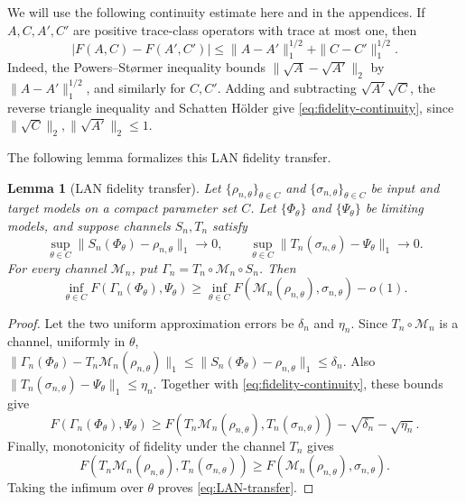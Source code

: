 \documentclass[11pt]{article}
\newtheorem{lemma}[lemma]{Lemma}
\theoremstyle{remark}
\theoremstyle{plain}
\newcommand{\cM}{\mathcal M}
\begin{document}
We will use the following continuity estimate here and in the appendices.  If
\(A,C,A',C'\) are positive trace-class operators with trace at most one, then
\begin{equation}\label{eq:fidelity-continuity}
  |F(A,C)-F(A',C')|
  \le \|A-A'\|_1^{1/2}+\|C-C'\|_1^{1/2}.
\end{equation}
Indeed, the Powers--St\o rmer inequality bounds
\(\|\sqrt A-\sqrt{A'}\|_2\) by \(\|A-A'\|_1^{1/2}\), and similarly for
\(C,C'\).  Adding and subtracting \(\sqrt{A'}\sqrt C\), the reverse triangle
inequality and Schatten H\"older give \eqref{eq:fidelity-continuity}, since
\(\|\sqrt C\|_2,\|\sqrt{A'}\|_2\le1\).

The following lemma formalizes this LAN fidelity transfer.

\begin{lemma}[LAN fidelity transfer]\label{lem:LAN-fidelity-transfer}
Let \(\{\rho_{n,\theta}\}_{\theta\in C}\) and
\(\{\sigma_{n,\theta}\}_{\theta\in C}\) be input and target models on a
compact parameter set \(C\).  Let \(\{\Phi_\theta\}\) and
\(\{\Psi_\theta\}\) be limiting models, and suppose channels \(S_n,T_n\)
satisfy
\[
  \sup_{\theta\in C}\|S_n(\Phi_\theta)-\rho_{n,\theta}\|_1\to0,
  \qquad
  \sup_{\theta\in C}\|T_n(\sigma_{n,\theta})-\Psi_\theta\|_1\to0.
\]
For every channel \(\cM_n\), put \(\Gamma_n=T_n\circ\cM_n\circ S_n\).
Then
\begin{equation}\label{eq:LAN-transfer}
  \inf_{\theta\in C}F(\Gamma_n(\Phi_\theta),\Psi_\theta)
  \ge
  \inf_{\theta\in C}F(\cM_n(\rho_{n,\theta}),\sigma_{n,\theta})-o(1).
\end{equation}
\end{lemma}

\begin{proof}
Let the two uniform approximation errors be \(\delta_n\) and \(\eta_n\).
Since \(T_n\circ\cM_n\) is a channel, uniformly in
\(\theta\),
\(\|\Gamma_n(\Phi_\theta)-T_n\cM_n(\rho_{n,\theta})\|_1
\le \|S_n(\Phi_\theta)-\rho_{n,\theta}\|_1\le\delta_n\).
Also
\(\|T_n(\sigma_{n,\theta})-\Psi_\theta\|_1\le\eta_n\).  Together with
\eqref{eq:fidelity-continuity}, these bounds give
\[
  F(\Gamma_n(\Phi_\theta),\Psi_\theta)
  \ge
  F(T_n\cM_n(\rho_{n,\theta}),T_n(\sigma_{n,\theta}))
  -\sqrt{\delta_n}-\sqrt{\eta_n}.
\]
Finally, monotonicity of fidelity under the channel \(T_n\) gives
\[
  F(T_n\cM_n(\rho_{n,\theta}),T_n(\sigma_{n,\theta}))
  \ge F(\cM_n(\rho_{n,\theta}),\sigma_{n,\theta}).
\]
Taking the infimum over \(\theta\) proves \eqref{eq:LAN-transfer}.
\end{proof}
\end{document}
